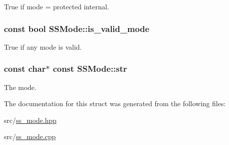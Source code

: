 True if mode = protected internal. 

\hypertarget{struct_s_s_mode_aa6039b890f5475f03fc14efb2bc143c9}{
\subsubsection[{is\-\_\-valid\-\_\-mode}]{\setlength{\rightskip}{0pt plus 5cm}const bool S\-S\-Mode\-::is\-\_\-valid\-\_\-mode}}\label{struct_s_s_mode_aa6039b890f5475f03fc14efb2bc143c9}


True if any mode is valid. 

\hypertarget{struct_s_s_mode_a82376c7c47401dc851ea16b1b35cd4b7}{
\subsubsection[{str}]{\setlength{\rightskip}{0pt plus 5cm}const char$\ast$ const S\-S\-Mode\-::str}}\label{struct_s_s_mode_a82376c7c47401dc851ea16b1b35cd4b7}


The mode. 



The documentation for this struct was generated from the following files\-:\begin{DoxyCompactItemize}
\item 
src/\hyperlink{ss__mode_8hpp}{ss\-\_\-mode.\-hpp}\item 
src/\hyperlink{ss__mode_8cpp}{ss\-\_\-mode.\-cpp}\end{DoxyCompactItemize}
